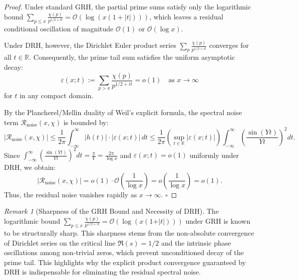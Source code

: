 \documentclass[12pt,reqno]{amsart}
\theoremstyle{definition}
\theoremstyle{remark}
\newtheorem{remark}[theorem]{Remark}
\numberwithin{equation}{section}
\begin{document}
\begin{proof}
Under standard GRH, the partial prime sums satisfy only the logarithmic bound $\sum_{p \le x} \frac{\chi(p)}{p^{1/2+it}} = \mathcal{O}(\log(x(1+|t|)))$, which leaves a residual conditional oscillation of magnitude $\mathcal{O}(1)$ or $\mathcal{O}(\log x)$. 

Under DRH, however, the Dirichlet Euler product series $\sum_{p} \frac{\chi(p)}{p^{1/2+it}}$ converges for all $t \in \mathbb{R}$. Consequently, the prime tail sum satisfies the uniform asymptotic decay:
\[
\varepsilon(x; t) := \sum_{p > x} \frac{\chi(p)}{p^{1/2+it}} = o(1) \quad \text{as } x \to \infty
\]
for $t$ in any compact domain. 

By the Plancherel/Mellin duality of Weil's explicit formula, the spectral noise term $\mathcal{R}_{\mathrm{noise}}(x, \chi)$ is bounded by:
\[
\left| \mathcal{R}_{\mathrm{noise}}(x, \chi) \right| \le \frac{1}{2\pi} \int_{-\infty}^{\infty} |h(t)| \cdot |\varepsilon(x; t)| \, dt \le \frac{1}{2\pi} \left( \sup_{t \in \mathbb{R}} |\varepsilon(x; t)| \right) \int_{-\infty}^{\infty} \left( \frac{\sin(Yt)}{Yt} \right)^2 dt.
\]
Since $\int_{-\infty}^{\infty} \left( \frac{\sin(Yt)}{Yt} \right)^2 dt = \frac{\pi}{Y} = \frac{2\pi}{\log x}$ and $\varepsilon(x; t) = o(1)$ uniformly under DRH, we obtain:
\[
\left| \mathcal{R}_{\mathrm{noise}}(x, \chi) \right| = o(1) \cdot \mathcal{O}\left( \frac{1}{\log x} \right) = o\left( \frac{1}{\log x} \right) = o(1).
\]
Thus, the residual noise vanishes rapidly as $x \to \infty$. $\square$\end{proof}

\begin{remark}[Sharpness of the GRH Bound and Necessity of DRH]
The logarithmic bound $\sum_{p \le x} \frac{\chi(p)}{p^{1/2+it}} = \mathcal{O}(\log(x(1+\vert{}t\vert{})))$ under GRH is known to be structurally sharp. This sharpness stems from the non-absolute convergence of Dirichlet series on the critical line $\Re(s) = 1/2$ and the intrinsic phase oscillations among non-trivial zeros, which prevent unconditioned decay of the prime tail. This highlights why the explicit product convergence guaranteed by DRH is indispensable for eliminating the residual spectral noise.
\end{remark}
\end{document}
